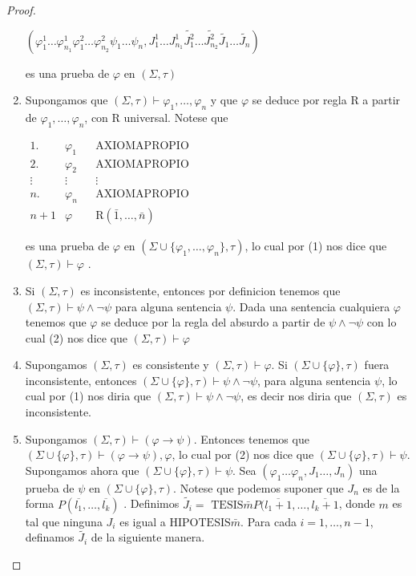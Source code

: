\begin{proof}
\begin{enumerate}
      $\displaystyle (\varphi_{1}^{1}\dotsc\varphi_{n_{1}}^{1}\varphi_{1}^{2}\dotsc\varphi_{n_{2}}^{2}\psi_{1}\dotsc\psi_{n},J_{1}^{1}\dotsc J_{n_{1}}^{1}\widetilde{ J_{1}^{2}}\dotsc\widetilde{J_{n_{2}}^{2}}\widetilde{J_{1}}\dotsc\widetilde{J_{n}}) $

      es una prueba de $\varphi$ en $(\Sigma, \tau)$

      \item Supongamos que $(\Sigma, \tau)\vdash \varphi_{1}, \dotsc, \varphi_{n}$ y que $\varphi$ se deduce por regla R a partir de $\varphi_{1}, \dotsc, \varphi_{n}$, con R universal. Notese que

      $\displaystyle \begin{array}{llll} 1.\; & \varphi_{1} & & \text{AXIOMAPROPIO} \\ 2.\; & \varphi_{2} & & \text{AXIOMAPROPIO} \\ \vdots & \vdots & & \vdots \\ n. & \varphi_{n} & & \text{AXIOMAPROPIO} \\ n+1 & \varphi & & \text{R}(\bar{1}, \dotsc, \bar{n}) \end{array} $

      es una prueba de $\varphi$ en $(\Sigma \cup \{\varphi_{1}, \dotsc, \varphi_{n}\},\tau )$, lo cual por (1) nos dice que $(\Sigma, \tau)\vdash \varphi $ .
      \item Si $(\Sigma, \tau)$ es inconsistente, entonces por definicion tenemos que $(\Sigma, \tau)\vdash \psi \wedge \lnot \psi $ para alguna sentencia $ \psi $. Dada una sentencia cualquiera $\varphi$ tenemos que $\varphi$ se deduce por la regla del absurdo a partir de $\psi \wedge \lnot \psi $ con lo cual (2) nos dice que $(\Sigma, \tau)\vdash \varphi $

      \item Supongamos $(\Sigma, \tau)$ es consistente y $(\Sigma, \tau)\vdash \varphi $. Si $(\Sigma \cup \{\varphi \},\tau )$ fuera inconsistente, entonces $(\Sigma \cup \{\varphi \},\tau )\vdash \psi \wedge \lnot \psi $, para alguna sentencia $\psi$, lo cual por (1) nos diria que $(\Sigma, \tau)\vdash \psi \wedge \lnot \psi $, es decir nos diria que $(\Sigma, \tau)$ es inconsistente.

      \item Supongamos $(\Sigma, \tau)\vdash (\varphi \rightarrow \psi )$. Entonces tenemos que $(\Sigma \cup \{\varphi \},\tau )\vdash (\varphi \rightarrow \psi ),\varphi $, lo cual por (2) nos dice que $(\Sigma \cup \{\varphi \},\tau )\vdash \psi $. Supongamos ahora que $(\Sigma \cup \{\varphi \},\tau )\vdash \psi $. Sea $(\varphi_{1}\dotsc\varphi_{n},J_{1}\dotsc,J_{n})$ una prueba de $\psi$ en $(\Sigma \cup \{\varphi \},\tau )$. Notese que podemos suponer que $J_{n}$ es de la forma $P(\overline{l_{1}}, \dotsc, \overline{l_{k}})$ . Definimos $\widetilde{J_{i}}=$ $\mathrm{TESIS}\bar{m}P(\overline{l_{1}+1} , \dotsc, \overline{l_{k}+1}$, donde $m$ es tal que ninguna $J_{i}$ es igual a $ \mathrm{HIPOTESIS}\bar{m}$. Para cada $i=1, \dotsc, n-1$, definamos $\widetilde{ J_{i}}$ de la siguiente manera.


\end{enumerate}
\end{proof}
